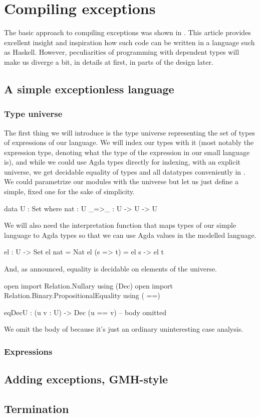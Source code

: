 \chapter{Compiling exceptions}

The basic approach to compiling exceptions was shown in \cite{gmh:exceptions}.
This article provides excellent insight and inspiration how such code can be written
in a language such as Haskell.
However, peculiarities of programming with dependent types will make us
diverge a bit, in details at first, in parts of the design later.

\section{A simple exceptionless language}

\subsection{Type universe}

The first thing we will introduce is the type universe representing the set of
types of expressions of our language. We will index our types with it (most
notably the expression type, denoting what the type of the expression in our
small language is), and while we could use Agda types directly for indexing,
with an explicit universe, we get decidable equality of types and all datatypes
conveniently in . We could parametrize our modules with the
universe but let us just define a simple, fixed one for the sake of simplicity.

\begin{code}
  data U : Set where
    nat : U
    _=>_ : U -> U -> U
\end{code}

\noindent We will also need the interpretation function that maps types of our
simple language to Agda types so that we can use Agda values in the modelled
language.

\begin{code}
  el : U -> Set
  el nat = Nat
  el (s => t) = el s -> el t
\end{code}

\noindent And, as announced, equality is decidable on elements of the universe.

\begin{code}
  open import Relation.Nullary using (Dec)
  open import Relation.Binary.PropositionalEquality using ( ==)

  eqDecU : (u v : U) -> Dec (u == v)
  -- body omitted
\end{code}

\noindent We omit the body of  because it's just an ordinary
uninteresting case analysis.

\subsection{Expressions}

\section{Adding exceptions, GMH-style}

\section{Termination}
